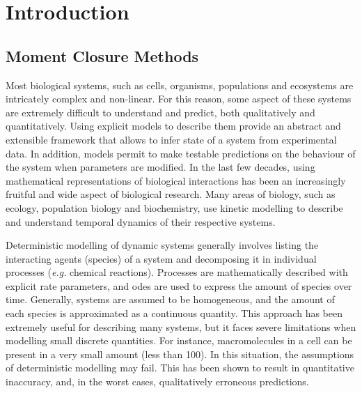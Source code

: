 \section{Introduction} \label{intro}
\subsection{Moment Closure Methods}

Most biological systems, such as cells, organisms, populations and ecosystems are intricately complex and non-linear.
For this reason, some aspect of these systems are extremely difficult to understand and predict, both qualitatively and quantitatively.
Using explicit models to describe them provide an abstract and extensible framework that allows to infer state of a system from experimental data.
In addition, models permit to make testable predictions on the behaviour of the system when parameters are modified.
In the last few decades, using mathematical representations of biological interactions has been an increasingly fruitful and wide aspect of biological research.
Many areas of biology, such as ecology, population biology and biochemistry,
use kinetic modelling to describe and understand temporal dynamics of their respective systems.

Deterministic modelling of dynamic systems generally involves listing the interacting agents (species) of a system and decomposing
it in individual processes (\emph{e.g.} chemical reactions).
Processes are mathematically described with explicit rate parameters, and \glspl{ode} are used to express the amount of species over time.
Generally, systems are assumed to be homogeneous, and the amount of each species is approximated as a continuous quantity.
This approach has been extremely useful for describing many systems, but it faces severe limitations when modelling small discrete quantities.
For instance, macromolecules in a cell can be present in a very small amount (less than 100).
In this situation, the assumptions of deterministic modelling may fail.
This has been shown to result in quantitative inaccuracy, and, in the worst cases, qualitatively erroneous predictions.


